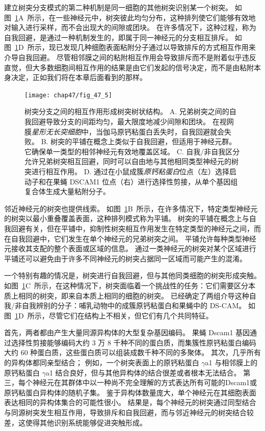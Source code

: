 建立树突分支模式的第二种机制是同一细胞的其他树突识别某一个树突。
如图~\ref{fig:47_5}A~所示，在一些神经元中，树突彼此均匀分布，这种排列使它们能够有效地对输入进行采样，而不会出现大的间隙或团块。
在许多情况下，这种过程，称为自我回避，是通过一种机制发生的，即属于同一神经元的分支相互排斥。
如图~\ref{fig:47_5}D~所示，现已发现几种细胞表面粘附分子通过以导致排斥的方式相互作用来介导自我回避。
尽管相邻膜之间的粘附相互作用会导致排斥而不是附着似乎违反直觉，但大多数细胞间相互作用的结果是由它们发起的信号决定，而不是由粘附本身决定，正如我们将在本章后面看到的那样。


\begin{figure}[htbp]
	\centering
	\texttt{[image: chap47/fig\_47\_5]}
	\caption{树突分支之间的相互作用形成树突树状结构。
		A. 兄弟树突之间的自我回避导致分支的间距均匀，最大限度地减少间隙和团块。
		在视网膜\textit{星形无长突细胞}中，当伽马原钙粘蛋白丢失时，自我回避就会失败。
		B. 树突的平铺在概念上类似于自我回避，但适用于神经元群。
		它确保单一类型的相邻神经元有效地覆盖区域。
		C. 自我/非自我区分允许兄弟树突相互回避，同时可以自由地与其他相同类型神经元的树突进行相互作用。
		D. 通过在小鼠成簇\textit{原钙粘蛋白}位点（左）选择启动子和在果蝇 DSCAM1 位点（右）进行选择性剪接，从单个基因组复合体生成大量粘附分子。}
	\label{fig:47_5}
\end{figure}


邻近神经元的树突也提供线索。
如图~\ref{fig:47_5}B~所示，在许多情况下，特定类型神经元的树突以最小重叠覆盖表面，这种排列模式称为平铺。
树突的平铺在概念上与自我回避有关，但在平铺中，抑制性树突相互作用发生在特定类型的神经元之间，而在自我回避中，它们发生在单个神经元的兄弟树突之间。
平铺允许每种类型神经元接收其支配的整个表面或区域的信息。
通过一类神经元的树突对某个区域进行平铺还可以避免由于许多不同神经元的树突占据同一区域而可能产生的混淆。


一个特别有趣的情况是，树突进行自我回避，但与其他同类细胞的树突形成突触。
如图~\ref{fig:47_5}C~所示，在这种情况下，树突面临着一个挑战性的任务：它们需要区分本质上相同的树突，即来自本质上相同的细胞的树突。
已经确定了两组介导这种自我/非自我辨别的分子：哺乳动物中的成簇原钙粘蛋白和果蝇中的 DS-CAM。
如图~\ref{fig:47_5}D~所示，尽管它们在结构上不相关，但它们有几个共同特征。


首先，两者都由产生大量同源异构体的大型复杂基因编码。
果蝇 Dscam1 基因通过选择性剪接能够编码大约 3 万 8 千种不同的蛋白质，而集簇性原钙粘蛋白编码大约 60 种蛋白质，这些蛋白质可以组装成数千种不同的多聚体。
其次，几乎所有的异构体都同亲型结合；
例如，一个树突表面上的原钙粘蛋白 $\gamma$a1 与相邻膜上的原钙粘蛋白 $\gamma$a1 结合良好，但与其他异构体的结合很差或者根本无法结合。
第三，每个神经元在其群体中以一种尚不完全理解的方式表达所有可能的Dscam1或原钙粘蛋白异构体的随机子集。
鉴于异构体数量庞大，单个神经元在其细胞表面表达相同的异构体集合的可能性很小。
结果是，每个神经元的树突通过同型结合与同源树突发生相互作用，导致排斥和自我回避，而与邻近神经元的树突结合较差，这使得其他识别系统能够促进突触形成。


